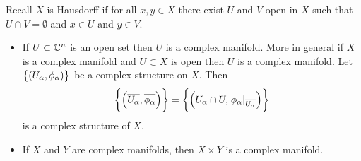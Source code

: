 Recall $ X $ is Hausdorff if for all $ x, y \in X $ there exist $ U $ and $ V $ open in $ X $ such that $ U \cap V = \emptyset $ and $ x \in U $ and $ y \in V $.


\begin{example}
\hfill
\begin{itemize}
\item If $ U \subset \mathbb{C}^n $ is an open set then $ U $ is a complex manifold. More in general if $ X $ is a complex manifold and $ U \subset X $ is open then $ U $ is a complex manifold. Let $ \cbr{\br{U_\alpha, \phi_\alpha}} $ be a complex structure on $ X $. Then
$$ \cbr{\br{\overline{U_\alpha}, \overline{\phi_\alpha}}} = \cbr{\br{U_\alpha \cap U, \eval{\phi_\alpha}_{\overline{U_\alpha}}}} $$
is a complex structure of $ X $.
\item If $ X $ and $ Y $ are complex manifolds, then $ X \times Y $ is a complex manifold.
\end{itemize}
\end{example}

